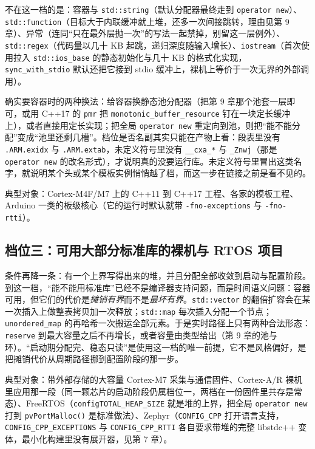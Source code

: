 \documentclass[12pt,a4paper,fontset=fandol]{ctexbook}
\newcommand{\cpp}[1]{C++#1}
\newcommand{\Fn}[1]{\texttt{#1()}}
\newcommand{\Tp}[1]{\texttt{#1}}
\newcommand{\Bk}{\discretionary{}{}{}}
\newcommand{\Lang}[1]{\textsf{#1}}
\newcommand{\DomRtos}{\Lang{RTOS}}
\begin{document}
不在这一档的是：容器与 \Tp{std::string}（默认分配器最终走到 \Tp{operator new}）、\Tp{std::function}（目标大于内联缓冲就上堆，还多一次间接跳转，理由见第 9 章）、异常（连同``只在最外层抛一次''的写法一起禁掉，别留这一层例外）、\Tp{std::regex}（代码量以几十 KB 起跳，递归深度随输入增长）、\Tp{iostream}（首次使用拉入 \Tp{std::ios{\Bk}\_base} 的静态初始化与几十 KB 的格式化实现，\Tp{sync{\Bk}\_with{\Bk}\_stdio} 默认还把它接到 stdio 缓冲上，裸机上等价于一次无界的外部调用）。

确实要容器时的两种换法：给容器换静态池分配器（把第 9 章那个池套一层即可，或用 \cpp{17} 的 \Tp{pmr} 把 \Tp{monotonic{\Bk}\_buffer{\Bk}\_resource} 钉在一块定长缓冲上），或者直接用定长实现；把全局 \Tp{operator new} 重定向到池，则把``能不能分配''变成``池里还剩几槽''。档位是否名副其实只能在产物上看：段表里没有 \Tp{.ARM.exidx} 与 \Tp{.ARM.extab}，未定义符号里没有 \Tp{\_\_cxa\_*} 与 \Tp{\_Znwj}（那是 \Tp{operator new} 的改名形式），才说明真的没要运行库。未定义符号里冒出这类名字，就说明某个头或某个模板实例悄悄越了档，而这一步在链接之前是看不见的。

典型对象：Cortex-M4F/M7 上的 \cpp{11} 到 \cpp{17} 工程、各家的模板工程、Arduino 一类的板级核心（它的运行时默认就带 \Tp{-fno-exceptions} 与 \Tp{-fno-rtti}）。

\subsection{档位三：可用大部分标准库的裸机与 \DomRtos{} 项目}

条件再降一条：有一个上界写得出来的堆，并且分配全部收敛到启动与配置阶段。到这一档，``能不能用标准库''已经不是编译器支持问题，而是时间语义问题：容器可用，但它们的代价是\emph{摊销有界}而不是\emph{最坏有界}。\Tp{std::vector} 的翻倍扩容会在某一次插入上做整表拷贝加一次释放；\Tp{std::map} 每次插入分配一个节点；\Tp{unordered\_map} 的再哈希一次搬运全部元素。于是实时路径上只有两种合法形态：\Tp{reserve} 到最大容量之后不再增长，或者容量由类型给出（第 9 章的池与环）。``启动期分配完、稳态只读''是使用这一档的唯一前提，它不是风格偏好，是把摊销代价从周期路径挪到配置阶段的那一步。

典型对象：带外部存储的大容量 Cortex-M7 采集与通信固件、Cortex-A/R 裸机里应用那一段（同一颗芯片的启动阶段仍属档位一，两档在一份固件里共存是常态）、FreeRTOS（\Tp{configTOTAL{\Bk}\_HEAP{\Bk}\_SIZE} 就是堆的上界，把全局 \Tp{operator new} 打到 \Fn{pvPortMalloc} 是标准做法）、Zephyr（\Tp{CONFIG{\Bk}\_CPP} 打开语言支持，\Tp{CONFIG{\Bk}\_CPP{\Bk}\_EXCEPTIONS} 与 \Tp{CONFIG{\Bk}\_CPP{\Bk}\_RTTI} 各自要求带堆的完整 libstdc++ 变体，最小化构建里没有展开器，见第 7 章）。
\end{document}
